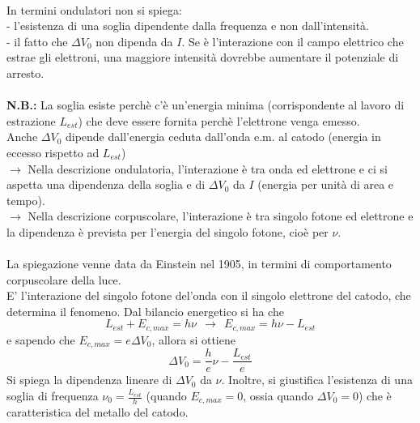 \documentclass{article}
\begin{document}
\\
In termini ondulatori non si spiega:\\
- l’esistenza di una soglia dipendente dalla frequenza e non dall’intensità.\\
- il fatto che $\Delta V_0$ non dipenda da $I$. Se è l’interazione con il campo elettrico che estrae gli elettroni, una maggiore intensità dovrebbe aumentare il potenziale di arresto.\\
\\
\textbf{N.B.:} La soglia esiste perchè c’è un’energia minima (corrispondente al lavoro di estrazione $L_{est}$) che deve essere fornita perchè l’elettrone venga emesso.\\
Anche $\Delta V_0$ dipende dall’energia ceduta dall’onda e.m. al catodo (energia in eccesso rispetto ad $L_{est}$)\\
$\rightarrow$ Nella descrizione ondulatoria, l’interazione è tra onda ed elettrone e ci si aspetta una dipendenza della soglia e di $\Delta V_0$ da $I$ (energia per unità di area e tempo).\\
$\rightarrow$ Nella descrizione corpuscolare, l’interazione è tra
singolo fotone ed elettrone e la dipendenza è prevista per
l’energia del singolo fotone, cioè per $\nu$.\\
\\
La spiegazione venne data da Einstein nel 1905, in termini di comportamento corpuscolare della luce.\\
E’ l’interazione del singolo fotone del’onda con il singolo elettrone del catodo, che determina il fenomeno.
Dal bilancio energetico si ha che
\begin{equation}
    L_{est} + E_{c,max}=h\nu \ \  \rightarrow \ \  E_{c,max}= h\nu - L_{est}
    \nonumber
\end{equation}
e sapendo che $E_{c,max}=e\Delta V_0$, allora si ottiene
\begin{equation}
    \Delta V_0=\frac{h}{e}\nu - \frac{L_{est}}{e}
    \nonumber
\end{equation}
Si spiega la dipendenza lineare di $\Delta V_0$ da $\nu$.
Inoltre, si giustifica l’esistenza di una soglia di frequenza $\nu_0=\frac{L_{est}}{h}$ (quando $E_{c,max}=0$, ossia quando $\Delta V_0=0$) che è caratteristica del metallo del catodo.\\
\end{document}
